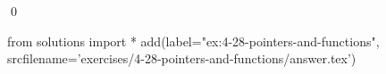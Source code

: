 
\begin{ex}
  \label{ex:4-28-pointers-and-functions}
  
  \qed
\end{ex}
\begin{python0}
from solutions import *
add(label="ex:4-28-pointers-and-functions",
    srcfilename='exercises/4-28-pointers-and-functions/answer.tex')
\end{python0}

